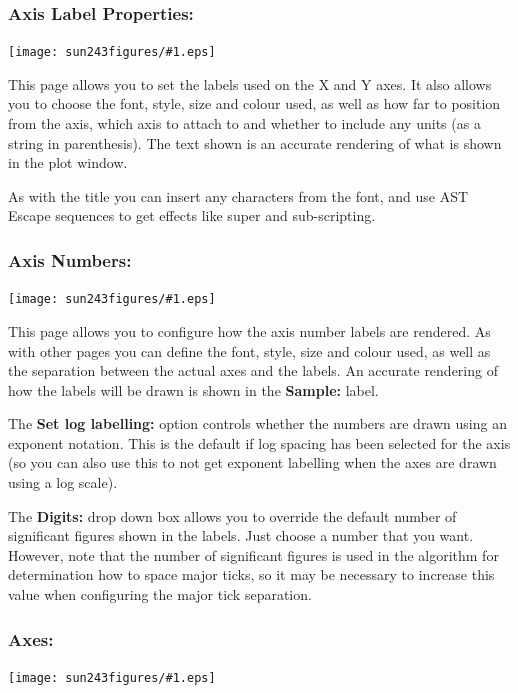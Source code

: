\documentclass[twoside,11pt]{article}
\newcommand{\htmladdimg}[1]{}
\newcommand{\latexhtml}[2]{#1}
\newcommand{\xref}[3]{#1}
\renewcommand{\_}{\texttt{\symbol{95}}}
\newcommand{\mainfigure}[1]
{\begin{center}
 \latexhtml{\texttt{[image: sun243\_figures/\#1.eps]}}{\htmladdimg{#1.gif}}
 \end{center}
}
\newcommand{\labelitem}[1]{\textbf{#1}}
\begin{document}
\newpage
\subsubsection*{Axis Label Properties:}

\mainfigure{configurewindowaxislabels}

This page allows you to set the labels used on the X and Y axes. It
also allows you to choose the font, style, size and colour used, as
well as how far to position from the axis, which axis to attach to and
whether to include any units (as a string in parenthesis). The text
shown is an accurate rendering of what is shown in the plot window.

As with the title you can insert any characters from the font, and use
\xref{AST}{sun211}{Escape} Escape sequences to get effects like super and
sub-scripting.

\newpage
\subsubsection*{Axis Numbers:}

\mainfigure{configurewindowaxisnumbers}

This page allows you to configure how the axis number labels are rendered. As
with other pages you can define the font, style, size and colour used, as well
as the separation between the actual axes and the labels. An accurate
rendering of how the labels will be drawn is shown in the \labelitem{Sample:}
label.

The \labelitem{Set log labelling:} option controls whether the numbers are
drawn using an exponent notation. This is the default if log spacing has been
selected for the axis (so you can also use this to not get exponent labelling
when the axes are drawn using a log scale).

The \labelitem{Digits:} drop down box allows you to override the
default number of significant figures shown in the labels. Just choose
a number that you want. However, note that the number of significant
figures is used in the algorithm for determination how to space major
ticks, so it may be necessary to increase this value when configuring
the major tick separation.

\newpage
\subsubsection*{Axes:}

\mainfigure{configurewindowaxes}
\end{document}
